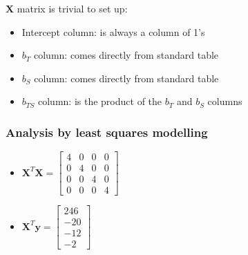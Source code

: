\begin{frame}
	\vspace{12pt}
	$\mathbf{X}$ matrix is trivial to set up:
	\begin{itemize}
		\item	Intercept column: is always a column of 1's
		\item	$b_T$ column: comes directly from standard table
		\item	$b_S$ column: comes directly from standard table
		\item	$b_{TS}$ column: is the product of the $b_T$ and $b_S$ columns
	\end{itemize}
\end{frame}

\begin{frame}\frametitle{Analysis by least squares modelling}
	\begin{itemize}
		\item	$\mathbf{X}^T\mathbf{X} =
		\begin{bmatrix}
			4 & 0 & 0 & 0\\
			0 & 4 & 0 & 0\\
			0 & 0 & 4 & 0\\
			0 & 0 & 0 & 4
		\end{bmatrix}
		$
		\item	$\mathbf{X}^T\mathbf{y} =
		\begin{bmatrix}
			246 \\
			-20 \\
			-12 \\
			-2
		\end{bmatrix}
		$
	\end{itemize}
\end{frame}

